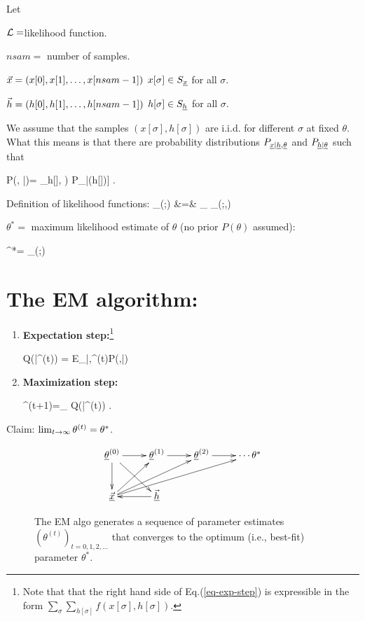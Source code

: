 Let
 
${\cal L}=$likelihood 
function.

$nsam=$ number of samples.

${\vec{x}}=(x[0], x[1], \ldots, x[nsam-1])$
 $x[\sigma]\in S_{\underline{x}}$ for all $\sigma$.

${\vec{h}}=(h[0], h[1], \ldots, h[nsam-1])$
$h[\sigma]\in S_{\underline{h}}$ for all $\sigma$.

We assume that the samples $(x[\sigma],h[\sigma])$
are i.i.d. for different $\sigma$ at fixed 
$\theta$.
What this means is that 
there are
probability distributions
$P_{{\underline{x}}|{\underline{h}},\underline{\theta}}$
and $P_{{\underline{h}}|\underline{\theta}}$
such that

\beq
P(\vecx, \vech|\theta)=
\prod_\sigma \left[P_{\rvx|\rvh,\ul{\theta}}
(x[\sigma]\cond h[\sigma], \theta)
P_{\rvh|\ul{\theta}}(h[\sigma]\cond \theta)\right]
\;.
\eeq

Definition of likelihood functions:
\beqa
{}
_{\call(\theta;\vecx)}
&=&
\sum_{\vech}
_{\call(\theta;\vecx,\vech)}
\eeqa


$\theta^*=$ maximum likelihood
estimate of $\theta$ (no prior $P(\theta)$
assumed):

\beq
\theta^*=
\argmax_\theta\call(\theta;\vecx)
\eeq

\section{The EM algorithm:}
\begin{enumerate}
\item{\bf Expectation step:}\footnote{
Note that
that
the right hand side of
Eq.(\ref{eq-exp-step})
is expressible 
in the form $\sum_\sigma 
\sum_{h[\sigma]}f(x[\sigma],
h[\sigma])$.}
 
\beq
Q(\theta|\theta^{(t)})
=
E_{\vech|\vecx,\theta^{(t)}}\ln P(\vecx,\vech|\theta)
\label{eq-exp-step}
\eeq

\item{\bf Maximization step:}

\beq
\theta^{(t+1)}=\argmax_\theta
Q(\theta|\theta^{(t)})
\label{eq-maxi-step}
\;.
\eeq
\end{enumerate}


Claim: $\lim_{t\rightarrow \infty}
\theta^{(t)}=\theta^*$.

\begin{figure}[h!]
$$\xymatrix{
\ul{\theta}^{(0)}\ar[d]\ar[dr]\ar[r]
&\ul{\theta}^{(1)}\ar[r]
&\ul{\theta}^{(2)}\ar[r]
&\cdots\theta^*
\\
\ul{\vecx}\ar[ru]\ar[rru]\ar[urrr]
&\ul{\vech}\ar[l]
}$$
\caption{
The EM algo generates 
a sequence of 
parameter estimates 
$(\theta^{(t)})_{t=0, 1,2, \ldots}$
that converges to the optimum (i.e., 
best-fit) parameter $\theta^*$.
}
\label{fig-emax-dynamical-bnet}
\end{figure}

